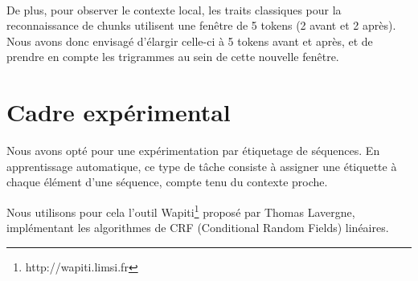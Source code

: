 \documentclass[a4paper,12pt]{article}
\begin{document}
\paragraph{}
De plus, pour observer le contexte local, les traits classiques pour la reconnaissance de chunks utilisent une fenêtre de 5 tokens (2 avant et 2 après). Nous avons donc envisagé d'élargir celle-ci à 5 tokens avant et après, et de prendre en compte les trigrammes au sein de cette nouvelle fenêtre.

% 
% 


\section{Cadre expérimental}

Nous avons opté pour une expérimentation par étiquetage de séquences. En apprentissage automatique, ce type de tâche consiste à assigner une étiquette à chaque élément d'une séquence, compte tenu du contexte proche.

Nous utilisons pour cela l'outil Wapiti\footnote{http://wapiti.limsi.fr} proposé par Thomas Lavergne, implémentant les algorithmes de CRF (Conditional Random Fields) linéaires.
\end{document}
